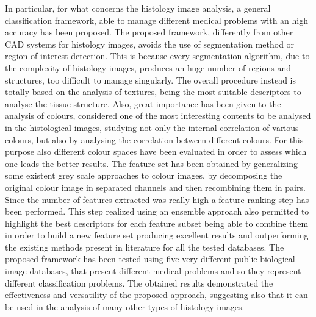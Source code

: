 \documentclass[final,a4paper,12pt,english]{UnicaPhdThesis3}
\begin{document}
	In particular, for what concerns the histology image analysis, a general classification framework, able to manage different medical problems with an high accuracy has been proposed. The proposed framework, differently from other CAD systems for histology images, avoids the use of segmentation method or region of interest detection.  This is because every segmentation algorithm, due to the complexity of histology images, produces an huge number of regions and structures, too difficult to manage singularly. The overall procedure instead is totally based on the analysis of textures, being the most suitable descriptors to analyse the tissue structure. Also, great importance has been given to the analysis of colours, considered one of the most interesting contents to be analysed in the histological images, studying not only the internal correlation of various colours, but also by analysing the correlation between different colours. For this purpose also different colour spaces have been evaluated in order to assess which one leads the better results. The feature set has been obtained by generalizing  some existent grey scale approaches to colour images, by decomposing the original colour image in separated channels and then recombining them in pairs. Since the number of features extracted was really high a feature ranking step has been performed. This step realized using an ensemble approach also permitted to highlight the best descriptors for each feature subset being able to combine them in order to build a new feature set producing excellent results and outperforming the existing methods present in literature for all the tested databases. The proposed framework has been tested using five very different public biological image databases, that present different medical problems and so they represent different classification problems. The obtained results demonstrated the effectiveness and versatility of the proposed approach, suggesting also that it can be used in the analysis of many other types of histology images.
	
\end{document}
